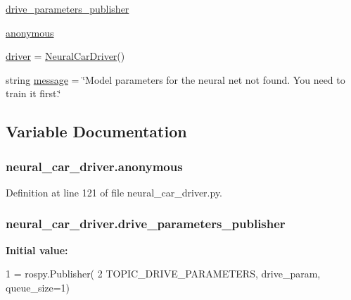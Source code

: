 \begin{DoxyCompactItemize}
\item 
\hyperlink{namespaceneural__car__driver_ac075b2fda9db2b43e338511958cfe9c2}{drive\+\_\+parameters\+\_\+publisher}
\item 
\hyperlink{namespaceneural__car__driver_ae254923f6ec524f563a598feeee010b9}{anonymous}
\item 
\hyperlink{namespaceneural__car__driver_a277afd40b4a20897467cac1f802344ee}{driver} = \hyperlink{classneural__car__driver_1_1_neural_car_driver}{Neural\+Car\+Driver}()
\item 
string \hyperlink{namespaceneural__car__driver_a65829420a3ca6888c41c04e36ad0c4fb}{message} = \char`\"{}Model parameters for the neural net not found. You need to train it first.\char`\"{}
\end{DoxyCompactItemize}


\subsection{Variable Documentation}
\subsubsection[{\texorpdfstring{anonymous}{anonymous}}]{\setlength{\rightskip}{0pt plus 5cm}neural\+\_\+car\+\_\+driver.\+anonymous}\hypertarget{namespaceneural__car__driver_ae254923f6ec524f563a598feeee010b9}{}\label{namespaceneural__car__driver_ae254923f6ec524f563a598feeee010b9}


Definition at line 121 of file neural\+\_\+car\+\_\+driver.\+py.

\subsubsection[{\texorpdfstring{drive\+\_\+parameters\+\_\+publisher}{drive_parameters_publisher}}]{\setlength{\rightskip}{0pt plus 5cm}neural\+\_\+car\+\_\+driver.\+drive\+\_\+parameters\+\_\+publisher}\hypertarget{namespaceneural__car__driver_ac075b2fda9db2b43e338511958cfe9c2}{}\label{namespaceneural__car__driver_ac075b2fda9db2b43e338511958cfe9c2}
{\bfseries Initial value\+:}
\begin{DoxyCode}
1 = rospy.Publisher(
2     TOPIC\_DRIVE\_PARAMETERS, drive\_param, queue\_size=1)
\end{DoxyCode}


